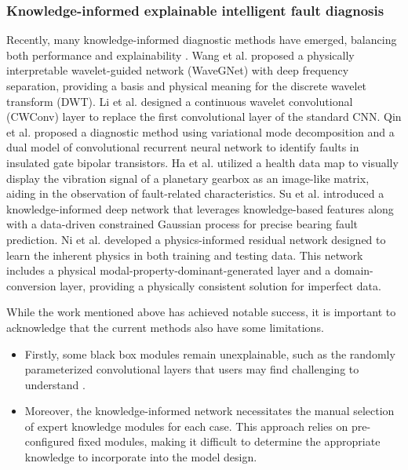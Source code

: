 \documentclass[lettersize,journal]{IEEEtran}
\begin{document}
\subsubsection{Knowledge-informed explainable intelligent fault diagnosis}
Recently, many knowledge-informed diagnostic methods have emerged, balancing both performance and explainability \cite{deng_physics-informed_2023}. Wang et al. \cite{wangPhysicallyInterpretableWaveletguided2024} proposed a physically interpretable wavelet-guided network (WaveGNet) with deep frequency separation, providing a basis and physical meaning for the discrete wavelet transform (DWT). Li et al. \cite{liWaveletKernelNetInterpretableDeep2020a} designed a continuous wavelet convolutional (CWConv) layer to replace the first convolutional layer of the standard CNN. Qin et al. \cite{qin_vwm-dcrnn_2023} proposed a diagnostic method using variational mode decomposition and a dual model of convolutional recurrent neural network to identify faults in insulated gate bipolar transistors. Ha et al. \cite{ha_domain_2023} utilized a health data map to visually display the vibration signal of a planetary gearbox as an image-like matrix, aiding in the observation of fault-related characteristics. Su et al. \cite{su_knowledge-informed_2024} introduced a knowledge-informed deep network that leverages knowledge-based features along with a data-driven constrained Gaussian process for precise bearing fault prediction. Ni et al. \cite{ni_physics-informed_2023} developed a physics-informed residual network designed to learn the inherent physics in both training and testing data. This network includes a physical modal-property-dominant-generated layer and a domain-conversion layer, providing a physically consistent solution for imperfect data.

While the work mentioned above has achieved notable success, it is important to acknowledge that the current methods also have some limitations.
\begin{itemize}
    \item Firstly, some black box modules remain unexplainable, such as the randomly parameterized convolutional layers that users may find challenging to understand \cite{Li2024_TON}.
    \item Moreover, the knowledge-informed network necessitates the manual selection of expert knowledge modules for each case. This approach relies on pre-configured fixed modules, making it difficult to determine the appropriate knowledge to incorporate into the model design.
\end{itemize}
\end{document}
